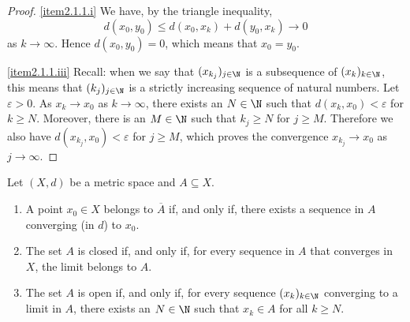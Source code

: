 \begin{proof}
\eqref{item2.1.1.i} We have, by the triangle inequality,
\[
d(x_0,y_0) \le d(x_0,x_k) + d(y_0,x_k) \to 0
\]
as $k \to \infty$. Hence $d(x_0,y_0) = 0$, which means that $x_0 = y_0$.

\eqref{item2.1.1.iii} Recall: when we say that $(x_{k_j})_{j \in \N}$ is a subsequence of $(x_k)_{k \in \N}$,
this means that $(k_j)_{j\in \N}$ is a strictly increasing sequence of natural numbers. Let $\varepsilon > 0$.
As $x_k \to x_0$ as $k \to \infty$, there exists an $N \in \N$ such that $d(x_k,x_0) < \varepsilon$ for $k \ge N$.
Moreover, there is an $M \in \N$ such that $k_j \ge N$ for $j \ge M$. Therefore we also have $d(x_{k_j},x_0) < \varepsilon$
for $j \ge M$, which proves the convergence $x_{k_j} \to x_0$ as $j \to \infty$.
\end{proof}

\begin{theorem} \label{thm:limit_closed}
Let $(X,d)$ be a metric space and $A \subseteq X$.
\begin{enumerate}
\item \label{item2.1.2.i} A point $x_0 \in X$ belongs to $\overline{A}$ if,
and only if, there exists a sequence in $A$ converging (in $d$) to $x_0$.
\item \label{item2.1.2.ii} The set $A$ is closed if, and only if, for every sequence
in $A$ that converges in $X$, the limit belongs to $A$.
\item \label{item2.1.2.iii} The set $A$ is open if, and only if, for
every sequence $(x_k)_{k \in \N}$  converging to a limit in $A$,
there exists an $N \in \N$ such that $x_k \in A$ for all $k \ge N$.
\end{enumerate}
\end{theorem}

\np

